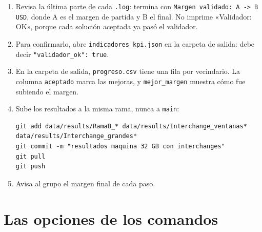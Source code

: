 \documentclass[11pt,a4paper]{article}
\begin{document}
\begin{enumerate}
  \item Revisa la última parte de cada \texttt{.log}: termina con \texttt{Margen validado: A -> B USD}, donde A es el margen de partida y B el final. No imprime «Validador: OK», porque cada solución aceptada ya pasó el validador.
  \item Para confirmarlo, abre \texttt{indicadores\_kpi.json} en la carpeta de salida: debe decir \texttt{"validador\_ok": true}.
  \item En la carpeta de salida, \texttt{progreso.csv} tiene una fila por vecindario. La columna \texttt{aceptado} marca las mejoras, y \texttt{mejor\_margen} muestra cómo fue subiendo el margen.
  \item Sube los resultados a la misma rama, nunca a \texttt{main}:
\begin{lstlisting}
git add data/results/RamaB_* data/results/Interchange_ventanas* data/results/Interchange_grandes*
git commit -m "resultados maquina 32 GB con interchanges"
git pull
git push
\end{lstlisting}
  \item Avisa al grupo el margen final de cada paso.
\end{enumerate}

\section{Las opciones de los comandos}
\end{document}
